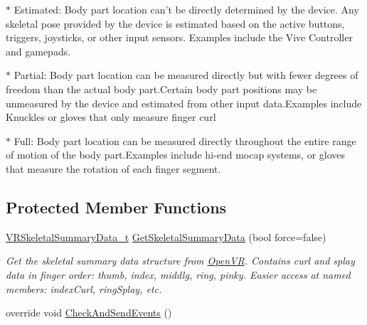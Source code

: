 \begin{DoxyCompactItemize}
\begin{DoxyCompactList}
$\ast$ Estimated\+: Body part location can’t be directly determined by the device. Any skeletal pose provided by the device is estimated based on the active buttons, triggers, joysticks, or other input sensors. Examples include the Vive Controller and gamepads. 

$\ast$ Partial\+: Body part location can be measured directly but with fewer degrees of freedom than the actual body part.\+Certain body part positions may be unmeasured by the device and estimated from other input data.\+Examples include Knuckles or gloves that only measure finger curl 

$\ast$ Full\+: Body part location can be measured directly throughout the entire range of motion of the body part.\+Examples include hi-\/end mocap systems, or gloves that measure the rotation of each finger segment. \end{DoxyCompactList}\end{DoxyCompactItemize}
\subsection*{Protected Member Functions}
\begin{DoxyCompactItemize}
\item 
\mbox{\hyperlink{struct_valve_1_1_v_r_1_1_v_r_skeletal_summary_data__t}{V\+R\+Skeletal\+Summary\+Data\+\_\+t}} \mbox{\hyperlink{class_valve_1_1_v_r_1_1_steam_v_r___action___skeleton___source_a1529fc50cc5aa572625dda77cddf5f6e}{Get\+Skeletal\+Summary\+Data}} (bool force=false)
\begin{DoxyCompactList}\small\item\em Get the skeletal summary data structure from \mbox{\hyperlink{class_valve_1_1_v_r_1_1_open_v_r}{Open\+VR}}. Contains curl and splay data in finger order\+: thumb, index, middlg, ring, pinky. Easier access at named members\+: index\+Curl, ring\+Splay, etc. \end{DoxyCompactList}\item 
override void \mbox{\hyperlink{class_valve_1_1_v_r_1_1_steam_v_r___action___skeleton___source_a28767b72b6df82708843c477b3740ccb}{Check\+And\+Send\+Events}} ()
\end{DoxyCompactItemize}
